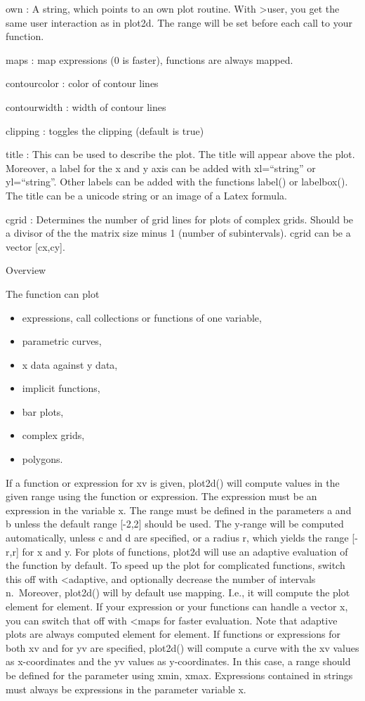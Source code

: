 \documentclass[
]{book}
\providecommand{\tightlist}{%
  \setlength{\itemsep}{0pt}\setlength{\parskip}{0pt}}
\begin{document}
own : A string, which points to an own plot routine. With \textgreater user, you get the same user interaction as in plot2d. The range will be set before each call to your function.

maps : map expressions (0 is faster), functions are always mapped.

contourcolor : color of contour lines

contourwidth : width of contour lines

clipping : toggles the clipping (default is true)

title : This can be used to describe the plot. The title will appear above the plot. Moreover, a label for the x and y axis can be added with xl=``string'' or yl=``string''. Other labels can be added with the functions label() or labelbox(). The title can be a unicode string or an image of a Latex formula.

cgrid : Determines the number of grid lines for plots of complex grids. Should be a divisor of the the matrix size minus 1 (number of subintervals). cgrid can be a vector {[}cx,cy{]}.

Overview

The function can plot

\begin{itemize}
\tightlist
\item
  expressions, call collections or functions of one variable,
\item
  parametric curves,
\item
  x data against y data,
\item
  implicit functions,
\item
  bar plots,
\item
  complex grids,
\item
  polygons.
\end{itemize}

If a function or expression for xv is given, plot2d() will compute values in the given range using the function or expression. The expression must be an expression in the variable x. The range must be defined in the parameters a and b unless the default range {[}-2,2{]} should be used. The y-range will be computed automatically, unless c and d are specified, or a radius r, which yields the range {[}-r,r{]} for x and y. For plots of functions, plot2d will use an adaptive evaluation of the function by default. To speed up the plot for complicated functions, switch this off with \textless adaptive, and optionally decrease the number of intervals n.~Moreover, plot2d() will by default use mapping. I.e., it will compute the plot element for element. If your expression or your functions can handle a vector x, you can switch that off with \textless maps for faster evaluation. Note that adaptive plots are always computed element for element. If functions or expressions for both xv and for yv are specified, plot2d() will compute a curve with the xv values as x-coordinates and the yv values as y-coordinates. In this case, a range should be defined for the parameter using xmin, xmax. Expressions contained in strings must always be expressions in the parameter variable x.
\end{document}

